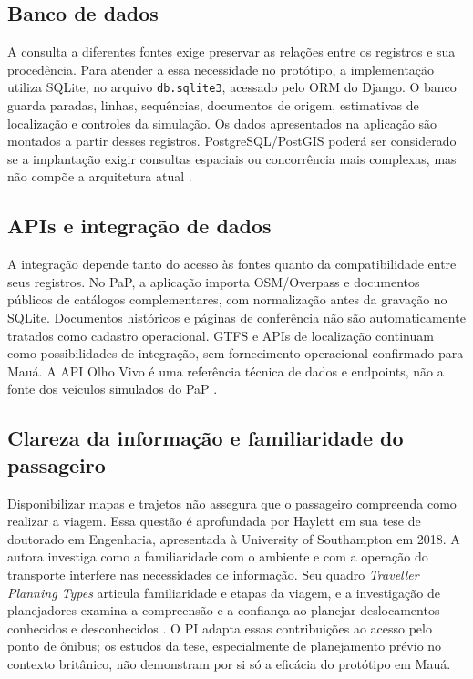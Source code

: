 \documentclass[12pt,oneside,a4paper,brazil]{abntex2}
\begin{document}
\subsection{Banco de dados}
A consulta a diferentes fontes exige preservar as relações entre os registros e sua procedência. Para atender a essa necessidade no protótipo, a implementação utiliza SQLite, no arquivo \texttt{db.sqlite3}, acessado pelo ORM do Django. O banco guarda paradas, linhas, sequências, documentos de origem, estimativas de localização e controles da simulação. Os dados apresentados na aplicação são montados a partir desses registros. PostgreSQL/PostGIS poderá ser considerado se a implantação exigir consultas espaciais ou concorrência mais complexas, mas não compõe a arquitetura atual \citep{postgis}.

\subsection{APIs e integração de dados}
A integração depende tanto do acesso às fontes quanto da compatibilidade entre seus registros. No PaP, a aplicação importa OSM/Overpass e documentos públicos de catálogos complementares, com normalização antes da gravação no SQLite. Documentos históricos e páginas de conferência não são automaticamente tratados como cadastro operacional. GTFS e APIs de localização continuam como possibilidades de integração, sem fornecimento operacional confirmado para Mauá. A API Olho Vivo é uma referência técnica de dados e endpoints, não a fonte dos veículos simulados do PaP \citep{sptransapi}.

\subsection{Clareza da informação e familiaridade do passageiro}
Disponibilizar mapas e trajetos não assegura que o passageiro compreenda como realizar a viagem. Essa questão é aprofundada por Haylett em sua tese de doutorado em Engenharia, apresentada à University of Southampton em 2018. A autora investiga como a familiaridade com o ambiente e com a operação do transporte interfere nas necessidades de informação. Seu quadro \textit{Traveller Planning Types} articula familiaridade e etapas da viagem, e a investigação de planejadores examina a compreensão e a confiança ao planejar deslocamentos conhecidos e desconhecidos \citep{haylett2018}. O PI adapta essas contribuições ao acesso pelo ponto de ônibus; os estudos da tese, especialmente de planejamento prévio no contexto britânico, não demonstram por si só a eficácia do protótipo em Mauá.
\end{document}
